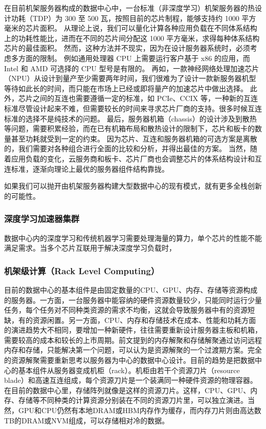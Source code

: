 在目前机架服务器构成的数据中心中，一台标准（非深度学习）机架服务器的热设计功耗（TDP）为 300 至 500 瓦，按照目前的芯片制程，能够支持约 1000 平方毫米的芯片面积。
从理论上说，我们可以量化计算各种应用负载在不同体系结构上的功耗性能比，进而在不同的芯片间分配这 1000 平方毫米，求得每种体系结构芯片的最佳面积。
然而，这种方法并不现实，因为在设计服务器系统时，必须考虑多方面的限制。
例如通用处理器 CPU 上需要运行客户基于 x86 的应用，而 Intel 和 AMD 可选择的 CPU 型号是有限的。
再如，一款神经网络处理加速芯片（NPU）从设计到量产至少需要两年时间，我们很难为了设计一款新服务器机型等待如此长的时间，而只能在市场上已经或即将量产的加速芯片中做出选择。
此外，芯片之间的互连也需要遵循一定的标准，如 PCIe、CCIX 等，一种新的互连标准尽管设计起来不难，但需要较长的时间来寻求芯片厂商的支持。很多时候互连标准的选择不是纯技术的问题。
最后，服务器机箱（chassis）的设计涉及到散热等问题，需要积累经验，而在已有机箱布局和散热设计的限制下，芯片和板卡的数量甚至功耗就受到一定的约束。
因为芯片、互连和服务器机箱的可选方案是离散的，我们需要对各种组合进行全面的比较和分析，并得出最佳的方案。
当然，随着应用负载的变化，云服务商和板卡、芯片厂商也会调整芯片的体系结构设计和互连标准，逐渐向理论上最优的服务器组件结构靠拢。

如果我们可以抛开由机架服务器构建大型数据中心的现有模式，就有更多全栈创新的可能性。

\subsubsection{深度学习加速器集群}

数据中心内的深度学习和传统机器学习需要处理海量的算力，单个芯片的性能不能满足需求。当多个芯片互联用于解决深度学习负载时，

\subsubsection{机架级计算（Rack Level Computing）}

目前的数据中心的基本组件是由固定数量的CPU、GPU、内存、存储等资源构成的服务器。一方面，一台服务器中能容纳的硬件资源数量较少，只能同时运行少量任务，每个任务对不同种类资源的需求不均衡，这就会导致服务器中有的资源短缺，有的资源闲置。另一方面，CPU、内存和存储技术在成本、性能和功耗方面的演进趋势大不相同，要增加一种新硬件，往往需要重新设计服务器主板和机箱，需要较高的成本和较长的上市周期。前文提到的内存解聚和存储解聚通过访问远程内存和存储，只能解决第一个问题，可以认为是资源解聚的一个过渡期方案。完全的资源解聚需要重新思考以服务器为中心的数据中心设计。目前的趋势是把数据中心的基本组件从服务器变成机柜（rack）。机柜由若干个资源刀片（resource blade）和高速互连组成，每个资源刀片是一个装满同一种硬件资源的物理容器。在目前的数据中心里，存储阵列就像是这样的资源刀片。这样，CPU、GPU、内存、存储等不同种类的计算资源分别装在不同的资源刀片里，可以独立演进。当然，GPU和CPU仍然有本地DRAM或HBM内存作为缓存，而内存刀片则由高达数TB的DRAM或NVM组成，可以存储相对冷的数据。

